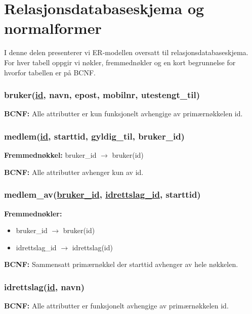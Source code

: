\section{Relasjonsdatabaseskjema og normalformer}

I denne delen presenterer vi ER-modellen oversatt til relasjonsdatabaseskjema. For hver tabell oppgir vi nøkler, fremmednøkler og en kort begrunnelse for hvorfor tabellen er på BCNF.

\newcommand{\schemaentry}[1]{%
  \subsubsection*{#1}%
  \vspace{-0.25em}%
}

\newenvironment{schemafks}{%
  \begin{itemize}
    \setlength{\itemsep}{0.05em}
    \setlength{\parskip}{0pt}
    \setlength{\topsep}{0pt}
    \setlength{\partopsep}{0pt}
    \setlength{\parsep}{0pt}
  }{%
  \end{itemize}
}

\schemaentry{bruker(\underline{id}, navn, epost, mobilnr, utestengt\_til)}
\textbf{BCNF:} Alle attributter er kun funksjonelt avhengige av primærnøkkelen id.

\vspace{0.8em}
\schemaentry{medlem(\underline{id}, starttid, gyldig\_til, bruker\_id)}
\textbf{Fremmednøkkel:} bruker\_id $\rightarrow$ bruker(id)\par
\vspace{0.15em}
\textbf{BCNF:} Alle attributter avhenger kun av id.

\vspace{0.8em}
\schemaentry{medlem\_av(\underline{bruker\_id}, \underline{idrettslag\_id}, starttid)}
\textbf{Fremmednøkler:}\par\vspace{-0.55em}
\begin{schemafks}
    \item bruker\_id $\rightarrow$ bruker(id)
    \item idrettslag\_id $\rightarrow$ idrettslag(id)
\end{schemafks}
\vspace{-0.2em}
\textbf{BCNF:} Sammensatt primærnøkkel der starttid avhenger av hele nøkkelen.

\vspace{0.8em}
\schemaentry{idrettslag(\underline{id}, navn)}
\textbf{BCNF:} Alle attributter er funksjonelt avhengige av primærnøkkelen id.

